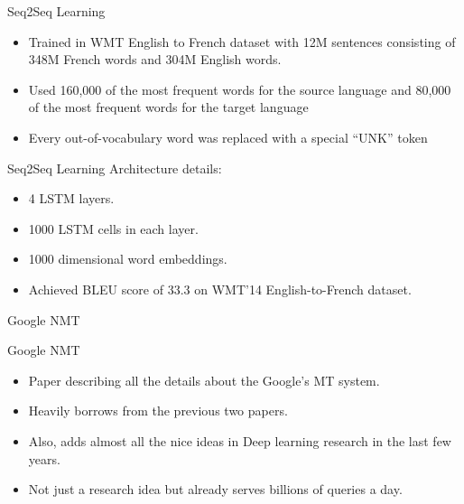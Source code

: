 ﻿\documentclass[table,aspectratio=43,mathserif,xcolor={usenames,dvipsnames,svgnames,table},10pt]{beamer}
\begin{document}
\begin{frame}{Seq2Seq Learning}
\begin{itemize}
 \item<+->  Trained in WMT English to French dataset with 12M sentences consisting of 348M French words and 304M English words.
 \item<+->  Used 160,000 of the most frequent words for the source language and 80,000 of the most frequent words for the target language
 \item<+->  Every out-of-vocabulary word was replaced with a special “UNK” token
\end{itemize}
\end{frame}

\begin{frame}{Seq2Seq Learning}
 Architecture details:
\begin{itemize}
 \item<+->  4 LSTM layers.
 \item<+->  1000 LSTM cells in each layer.
 \item<+->  1000 dimensional word embeddings.
 \item<+->  Achieved BLEU score of 33.3 on WMT’14 English-to-French dataset.
\end{itemize}
\end{frame}


\begin{section}{Google NMT}
\end{section}

\begin{frame}{Google NMT}
\begin{itemize}
 \item<+-> Paper describing all the details about the Google's MT system.
 \item<+-> Heavily borrows from the previous two papers.
 \item<+-> Also, adds almost all the nice ideas in Deep learning research in the last few years.
 \item<+-> Not just a research idea but already serves billions of queries a day.
\end{itemize}
\end{frame}
\end{document}
